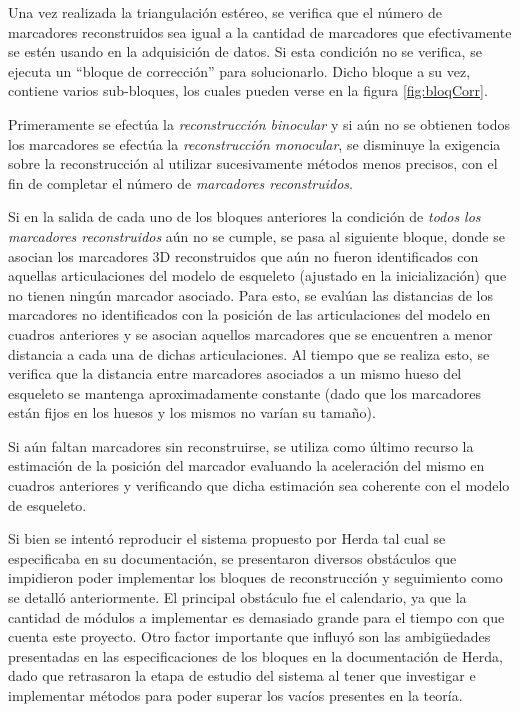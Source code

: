 Una vez realizada la triangulación estéreo, se verifica que el número de marcadores reconstruidos sea igual a la cantidad de marcadores que efectivamente se estén usando en la adquisición de datos. Si esta condición no se verifica, se ejecuta un “bloque de corrección” para solucionarlo. Dicho bloque a su vez, contiene  varios sub-bloques, los cuales pueden verse en la figura \ref{fig:bloqCorr}.

Primeramente se efectúa la \emph{reconstrucción binocular} y si aún no se obtienen todos los marcadores se efectúa la \emph{reconstrucción monocular}, se disminuye la exigencia sobre la reconstrucción al utilizar sucesivamente métodos menos precisos, con el fin de completar el número de \emph{marcadores reconstruidos}.

 Si en la salida de cada uno de los bloques anteriores la condición de \emph{todos los marcadores reconstruidos} aún no se cumple, se pasa al siguiente bloque, donde se asocian los marcadores 3D reconstruidos que aún no fueron identificados con aquellas articulaciones del modelo de esqueleto (ajustado en la inicialización) que no tienen ningún marcador asociado. Para esto, se evalúan las distancias de los marcadores no identificados con la posición de las articulaciones del modelo en cuadros anteriores y se asocian aquellos marcadores que se encuentren a menor distancia a cada una de dichas articulaciones. Al tiempo que se realiza esto, se verifica que la distancia entre marcadores asociados a un mismo hueso del esqueleto se mantenga aproximadamente constante (dado que los marcadores están fijos en los huesos y los mismos no varían su tamaño).
 
Si aún faltan marcadores sin reconstruirse, se utiliza como último recurso la estimación de la posición del marcador evaluando la aceleración del mismo en cuadros anteriores y verificando que dicha estimación sea coherente con el modelo de esqueleto.



Si bien se intentó reproducir el sistema propuesto por Herda\cite{herda} tal cual se especificaba en su documentación, se presentaron diversos obstáculos que impidieron poder implementar los bloques de reconstrucción y seguimiento como se detalló anteriormente. El principal obstáculo fue el calendario, ya que la cantidad de módulos a implementar es demasiado grande para el tiempo con que cuenta este proyecto. Otro factor importante que influyó son las ambigüedades presentadas en las especificaciones de los bloques en la documentación de Herda, dado que retrasaron la etapa de estudio del sistema al tener que investigar e implementar métodos para poder superar los vacíos presentes en la teoría.


